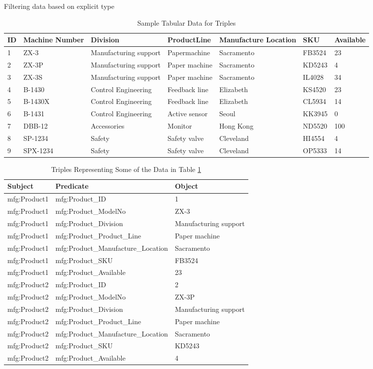 \begin{challenge}{Filtering data based on explicit type}
\begin{table}[h]
\centering
\begin{tabular}{||l l l l l l l ||} 
 \hline
 ID&Machine Number&Division&ProductLine&Manufacture Location&SKU&Available \\ 
 \hline\hline
1&ZX-3&Manufacturing support&Papermachine&Sacramento&FB3524&23\\
2&ZX-3P&Manufacturing support&Paper machine&Sacramento&KD5243&4\\
3&ZX-3S&Manufacturing support&Paper machine&Sacramento&IL4028&34\\
4&B-1430&Control Engineering&Feedback line&Elizabeth&KS4520&23\\
5&B-1430X&Control Engineering&Feedback line&Elizabeth&CL5934&14\\
6&B-1431&Control Engineering&Active sensor&Seoul&KK3945&0\\
7&DBB-12&Accessories&Monitor&Hong Kong&ND5520&100\\
8&SP-1234&Safety&Safety valve&Cleveland&HI4554&4\\
9&SPX-1234&Safety&Safety valve&Cleveland&OP5333&14\\
\hline
\end{tabular}
\caption{Sample Tabular Data for Triples}
\label{tab:ch12.1}
\end{table}


\begin{table}[h]
\centering
\begin{tabular}{||l l l ||} 
 \hline
 Subject&Predicate&Object \\ 
 \hline\hline
mfg:Product1&mfg:Product\_ID&1 \\
mfg:Product1&mfg:Product\_ModelNo&ZX-3 \\
mfg:Product1&mfg:Product\_Division&Manufacturing support \\
mfg:Product1&mfg:Product\_Product\_Line&Paper machine \\
mfg:Product1&mfg:Product\_Manufacture\_Location&Sacramento \\
mfg:Product1&mfg:Product\_SKU&FB3524 \\
mfg:Product1&mfg:Product\_Available&23 \\
mfg:Product2&mfg:Product\_ID&2\\
mfg:Product2&mfg:Product\_ModelNo&ZX-3P\\
mfg:Product2&mfg:Product\_Division&Manufacturing support \\
mfg:Product2&mfg:Product\_Product\_Line&Paper machine \\
mfg:Product2&mfg:Product\_Manufacture\_Location&Sacramento\\
mfg:Product2&mfg:Product\_SKU&KD5243\\
mfg:Product2&mfg:Product\_Available&4\\
\hline
\end{tabular}
\caption{Triples Representing Some of the Data in Table \protect\ref{tab:ch12.1}}
\label{tab:ch12.2}
\end{table}

\end{challenge}
